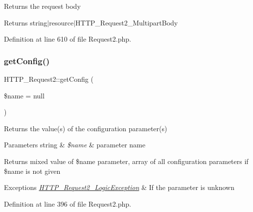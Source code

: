 Returns the request body

\begin{DoxyReturn}{Returns}
string$\vert$resource$\vert$\+H\+T\+T\+P\+\_\+\+Request2\+\_\+\+Multipart\+Body 
\end{DoxyReturn}


Definition at line 610 of file Request2.\+php.

\mbox{\label{classHTTP__Request2_a420485bbf5cc4a95399fe01138fe6ce6}} 
\subsubsection{\texorpdfstring{get\+Config()}{getConfig()}}
{\footnotesize\ttfamily H\+T\+T\+P\+\_\+\+Request2\+::get\+Config (\begin{DoxyParamCaption}\item[{}]{\$name = {\ttfamily null} }\end{DoxyParamCaption})}

Returns the value(s) of the configuration parameter(s)


\begin{DoxyParams}[1]{Parameters}
string & {\em \$name} & parameter name\\
\hline
\end{DoxyParams}
\begin{DoxyReturn}{Returns}
mixed value of \$name parameter, array of all configuration parameters if \$name is not given 
\end{DoxyReturn}

\begin{DoxyExceptions}{Exceptions}
{\em \hyperlink{classHTTP__Request2__LogicException}{H\+T\+T\+P\+\_\+\+Request2\+\_\+\+Logic\+Exception}} & If the parameter is unknown \\
\hline
\end{DoxyExceptions}


Definition at line 396 of file Request2.\+php.

\mbox{\label{classHTTP__Request2_ad56d5f45235cb4f753d1ee9c7cd4c0e0}} 
